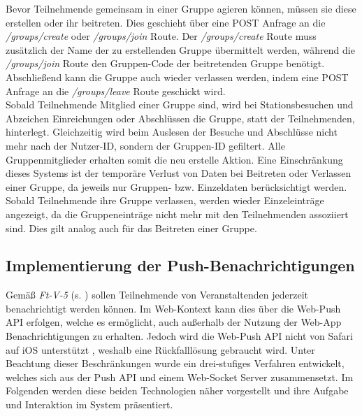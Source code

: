 Bevor Teilnehmende gemeinsam in einer Gruppe agieren können, müssen sie diese
erstellen oder ihr beitreten. Dies geschieht über eine POST Anfrage an die
\textit{/groups/create} oder \textit{/groups/join} Route. Der
\textit{/groups/create} Route muss zusätzlich der Name der zu erstellenden
Gruppe übermittelt werden, während die \textit{/groups/join} Route den
Gruppen-Code der beitretenden Gruppe benötigt. Abschließend kann die Gruppe auch
wieder verlassen werden, indem eine POST Anfrage an die \textit{/groups/leave}
Route geschickt wird.
\\
Sobald Teilnehmende Mitglied einer Gruppe sind, wird bei Stationsbesuchen und
Abzeichen Einreichungen oder Abschlüssen die Gruppe, statt der Teilnehmenden,
hinterlegt. Gleichzeitig wird beim Auslesen der Besuche und Abschlüsse nicht
mehr nach der Nutzer-ID, sondern der Gruppen-ID gefiltert. Alle
Gruppenmitglieder erhalten somit die neu erstelle Aktion. Eine Einschränkung
dieses Systems ist der temporäre Verlust von Daten bei Beitreten oder Verlassen
einer Gruppe, da jeweils nur Gruppen- bzw. Einzeldaten berücksichtigt werden.
Sobald Teilnehmende ihre Gruppe verlassen, werden wieder Einzeleinträge
angezeigt, da die Gruppeneinträge nicht mehr mit den Teilnehmenden
assoziiert sind. Dies gilt analog auch für das Beitreten einer Gruppe.

\subsection{Implementierung der Push-Benachrichtigungen} \label{ssec:impl-backend-push}
\label{ssec:impl-backend-push}

Gemäß \textit{Ft-V-5} (s. ) sollen Teilnehmende von
Veranstaltenden jederzeit benachrichtigt werden können. Im Web-Kontext kann dies
über die Web-Push API erfolgen, welche es ermöglicht, auch außerhalb der Nutzung
der Web-App Benachrichtigungen zu erhalten. Jedoch wird die Web-Push API nicht
von Safari auf iOS unterstützt \cite{MDN2021}, weshalb eine Rückfalllösung
gebraucht wird. Unter Beachtung dieser Beschränkungen wurde ein drei-stufiges
Verfahren entwickelt, welches sich aus der Push API und einem Web-Socket Server
zusammensetzt. Im Folgenden werden diese beiden Technologien näher vorgestellt
und ihre Aufgabe und Interaktion im System präsentiert.

